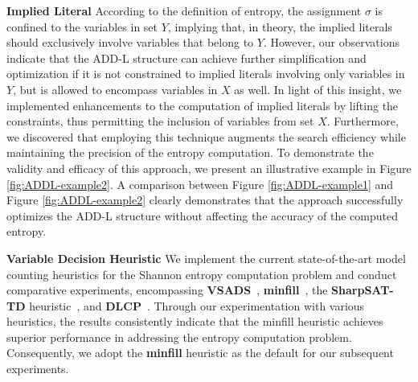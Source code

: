 \textbf{Implied Literal}
According to the definition of entropy, the assignment $\sigma$ is confined to the variables in set $Y$, implying that, in theory, the implied literals should exclusively involve variables that belong to $Y$.
However, our observations indicate that the ADD-L structure can achieve further simplification and optimization if it is not constrained to implied literals involving only variables in $Y$, but is allowed to encompass variables in $X$ as well.
In light of this insight, we implemented enhancements to the computation of implied literals by lifting the constraints, thus permitting the inclusion of variables from set $X$. 
Furthermore, we discovered that employing this technique augments the search efficiency while maintaining the precision of the entropy computation.
To demonstrate the validity and efficacy of this approach, we present an illustrative example in Figure \ref{fig:ADDL-example2}.
A comparison between Figure \ref{fig:ADDL-example1} and Figure \ref{fig:ADDL-example2} clearly demonstrates that the approach successfully optimizes the ADD-L structure without affecting the accuracy of the computed entropy.

\textbf{Variable Decision Heuristic} 
We implement the current state-of-the-art model counting heuristics for the Shannon entropy computation problem and conduct comparative experiments, encompassing \textbf{VSADS}~\cite{sang2005heuristics}, \textbf{minfill}~\cite{darwiche2009modeling}, the \textbf{SharpSAT-TD} heuristic~\cite{korhonen2021integrating}, and \textbf{DLCP}~\cite{lai2021power}.
Through our experimentation with various heuristics, the results consistently indicate that the minfill heuristic achieves superior performance in addressing the entropy computation problem.
Consequently, we adopt the \textbf{minfill} heuristic as the default for our subsequent experiments.

